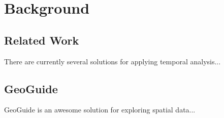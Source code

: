 \chapter{Background}
\label{chap:background}

\section{Related Work}

There are currently several solutions for applying temporal analysis...

\section{GeoGuide}

GeoGuide is an awesome solution for exploring spatial data...